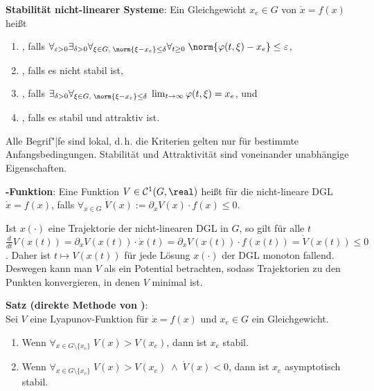 \textbf{Stabilität nicht-linearer Systeme}:
Ein Gleichgewicht $x_e \in G$ von $\dot{x} = f(x)$ heißt
\begin{enumerate}
    \item
    , falls
    $\forall_{\varepsilon > 0} \exists_{\delta > 0}
    \forall_{\xi \in G,\; \norm{\xi - x_e} \le \delta} \forall_ {t \ge 0}\;
    \norm{\varphi(t, \xi) - x_e} \le \varepsilon$,
    
    \item
    , falls es nicht stabil ist,
    
    \item
    , falls
    $\exists_{\delta > 0} \forall_{\xi \in G,\; \norm{\xi - x_e} \le \delta}\;
    \lim_{t \to \infty} \varphi(t, \xi) = x_e$, und
    
    \item
    , falls es stabil und attraktiv ist.
\end{enumerate}

Alle Begrif"|fe sind lokal, d.\,h. die Kriterien gelten nur für bestimmte Anfangsbedingungen.
Stabilität und Attraktivität sind voneinander unabhängige Eigenschaften.

\linie

\textbf{-Funktion}:
Eine Funktion $V \in \C^1(G, \real)$ heißt
 für die nicht-lineare DGL $\dot{x} = f(x)$, falls
$\forall_{x \in G}\; \dot{V}(x) := \partial_x V(x) \cdot f(x) \le 0$.

Ist $x(\cdot)$ eine Trajektorie der nicht-linearen DGL in $G$, so gilt für alle $t$\\
$\frac{d}{dt} V(x(t)) = \partial_x V(x(t)) \cdot \dot{x}(t)
= \partial_x V(x(t)) \cdot f(x(t)) = \dot{V}(x(t)) \le 0$.
Daher ist $t \mapsto V(x(t))$ für jede Lösung $x(\cdot)$ der DGL monoton fallend.
Deswegen kann man $V$ als ein Potential betrachten,
sodass Trajektorien zu den Punkten konvergieren, in denen $V$ minimal ist.

\linie

\textbf{Satz (direkte Methode von )}:\\
Sei $V$ eine Lyapunov-Funktion für $\dot{x} = f(x)$ und $x_e \in G$ ein Gleichgewicht.
\begin{enumerate}
    \item
    Wenn $\forall_{x \in G \setminus \{x_e\}}\; V(x) > V(x_e)$,
    dann ist $x_e$ stabil.
    
    \item
    Wenn $\forall_{x \in G \setminus \{x_e\}}\; V(x) > V(x_e) \;\land\; \dot{V}(x) < 0$,
    dann ist $x_e$ asymptotisch stabil.
\end{enumerate}

